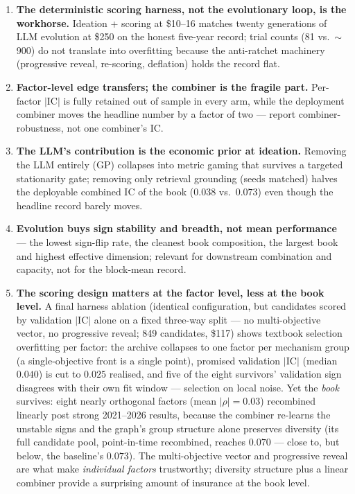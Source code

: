 \documentclass[11pt,a4paper]{article}
\begin{document}
\begin{enumerate}
\item \textbf{The deterministic scoring harness, not the evolutionary loop,
is the workhorse.} Ideation + scoring at \$10--16 matches twenty generations
of LLM evolution at \$250 on the honest five-year record; trial counts (81
vs.\ $\sim$900) do not translate into overfitting because the anti-ratchet
machinery (progressive reveal, re-scoring, deflation) holds the record flat.
\item \textbf{Factor-level edge transfers; the combiner is the fragile
part.} Per-factor $|$IC$|$ is fully retained out of sample in every arm,
while the deployment combiner moves the headline number by a factor of two
--- report combiner-robustness, not one combiner's IC.
\item \textbf{The LLM's contribution is the economic prior at ideation.}
Removing the LLM entirely (GP) collapses into metric gaming that survives a
targeted stationarity gate; removing only retrieval grounding (seeds
matched) halves the deployable combined IC of the book ($0.038$ vs.\
$0.073$) even though the headline record barely moves.
\item \textbf{Evolution buys sign stability and breadth, not mean
performance} --- the lowest sign-flip rate, the cleanest book composition,
the largest book and highest effective dimension; relevant for downstream
combination and capacity, not for the block-mean record.
\item \textbf{The scoring design matters at the factor level, less at the
book level.} A final harness ablation (identical configuration, but
candidates scored by validation $|$IC$|$ alone on a fixed three-way split ---
no multi-objective vector, no progressive reveal; 849 candidates, \$117)
shows textbook selection overfitting per factor: the archive collapses to
one factor per mechanism group (a single-objective front is a single point),
promised validation $|$IC$|$ (median $0.040$) is cut to $0.025$ realised, and
five of the eight survivors' validation sign disagrees with their own fit
window --- selection on local noise. Yet the \emph{book} survives: eight
nearly orthogonal factors (mean $|\rho|=0.03$) recombined linearly post
strong 2021--2026 results, because the combiner re-learns the unstable signs
and the graph's group structure alone preserves diversity (its full candidate
pool, point-in-time recombined, reaches $0.070$ --- close to, but below, the
baseline's $0.073$). The multi-objective vector and progressive reveal are
what make \emph{individual factors} trustworthy; diversity structure plus a
linear combiner provide a surprising amount of insurance at the book level.
\end{enumerate}
\end{document}
